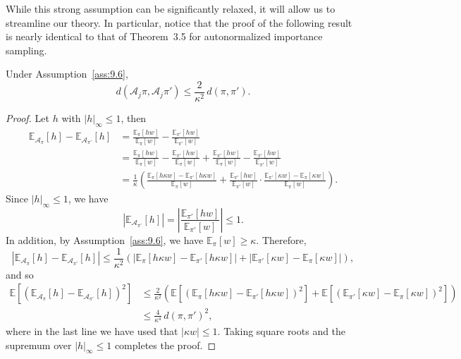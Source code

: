 While this strong assumption can be significantly relaxed, it will allow us to streamline
our theory. In particular, notice that the proof of the following result is nearly
identical to that of Theorem~3.5 for autonormalized importance sampling.

\begin{lemma}
  \label{lem:9.7}
  Under Assumption~\ref{ass:9.6},
  \[
    d(\mathcal{A}_j\pi, \mathcal{A}_j\pi') \leq \frac{2}{\kappa^2}\,d(\pi, \pi').
  \]
\end{lemma}

\begin{proof}
  Let $h$ with $|h|_\infty \leq 1$, then
  \begin{align*}
    \mathbb{E}_{\mathcal{A}_\pi}[h] - \mathbb{E}_{\mathcal{A}_{\pi'}}[h]
    &= \frac{\mathbb{E}_\pi[hw]}{\mathbb{E}_\pi[w]}
     - \frac{\mathbb{E}_{\pi'}[hw]}{\mathbb{E}_{\pi'}[w]} \\
    &= \frac{\mathbb{E}_\pi[hw]}{\mathbb{E}_\pi[w]}
     - \frac{\mathbb{E}_{\pi'}[hw]}{\mathbb{E}_\pi[w]}
     + \frac{\mathbb{E}_{\pi'}[hw]}{\mathbb{E}_\pi[w]}
     - \frac{\mathbb{E}_{\pi'}[hw]}{\mathbb{E}_{\pi'}[w]} \\
    &= \frac{1}{\kappa}\!\left(
       \frac{\mathbb{E}_\pi[h\kappa w] - \mathbb{E}_{\pi'}[h\kappa w]}{\mathbb{E}_\pi[w]}
       + \frac{\mathbb{E}_{\pi'}[hw]}{\mathbb{E}_{\pi'}[w]}
         \cdot
         \frac{\mathbb{E}_{\pi'}[\kappa w] - \mathbb{E}_\pi[\kappa w]}{\mathbb{E}_\pi[w]}
      \right).
  \end{align*}
  Since $|h|_\infty \leq 1$, we have
  \[
    \left|\mathbb{E}_{\mathcal{A}_{\pi'}}[h]\right|
    = \left|\frac{\mathbb{E}_{\pi'}[hw]}{\mathbb{E}_{\pi'}[w]}\right| \leq 1.
  \]
  In addition, by Assumption~\ref{ass:9.6}, we have $\mathbb{E}_\pi[w] \geq \kappa$.
  Therefore,
  \[
    \left|\mathbb{E}_{\mathcal{A}_\pi}[h] - \mathbb{E}_{\mathcal{A}_{\pi'}}[h]\right|
    \leq \frac{1}{\kappa^2}\!\left(
      \left|\mathbb{E}_\pi[h\kappa w] - \mathbb{E}_{\pi'}[h\kappa w]\right|
      + \left|\mathbb{E}_{\pi'}[\kappa w] - \mathbb{E}_\pi[\kappa w]\right|
    \right),
  \]
  and so
  \begin{align*}
    \mathbb{E}\!\left[\left(\mathbb{E}_{\mathcal{A}_\pi}[h]
      - \mathbb{E}_{\mathcal{A}_{\pi'}}[h]\right)^2\right]
    &\leq \frac{2}{\kappa^2}\!\left(
       \mathbb{E}\!\left[\left(\mathbb{E}_\pi[h\kappa w]
         - \mathbb{E}_{\pi'}[h\kappa w]\right)^2\right]
       + \mathbb{E}\!\left[\left(\mathbb{E}_{\pi'}[\kappa w]
         - \mathbb{E}_\pi[\kappa w]\right)^2\right]
      \right) \\
    &\leq \frac{4}{\kappa^4}\,d(\pi, \pi')^2,
  \end{align*}
  where in the last line we have used that $|\kappa w| \leq 1$. Taking square roots and
  the supremum over $|h|_\infty \leq 1$ completes the proof.
\end{proof}

